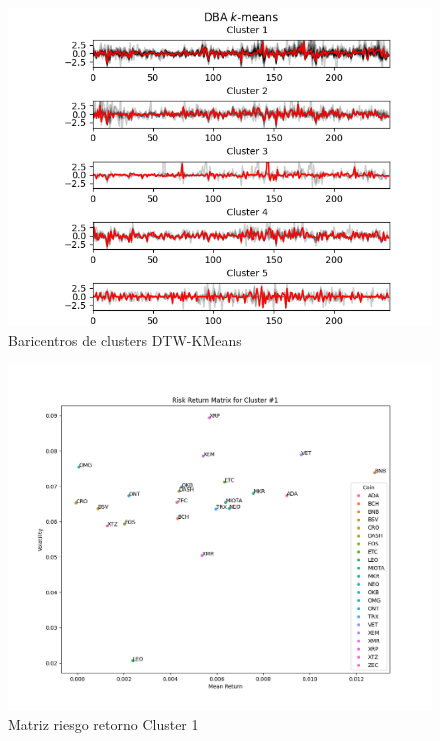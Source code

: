 \documentclass[runningheads,legalpaper,10pt]{etc/llncs}
\begin{document}
\begin{figure}[htp]
    \centering
    \includegraphics[scale=0.9]{images/DTW_clusters.png}
    \caption{Baricentros de clusters DTW-KMeans}
    \label{fig:DTW_clusters}
\end{figure}

\begin{figure}[htp]
    \centering
    \includegraphics[scale=0.5]{images/cluster_1.png}
    \caption{Matriz riesgo retorno Cluster 1}
    \label{fig:cluster_1}
\end{figure}
\end{document}
